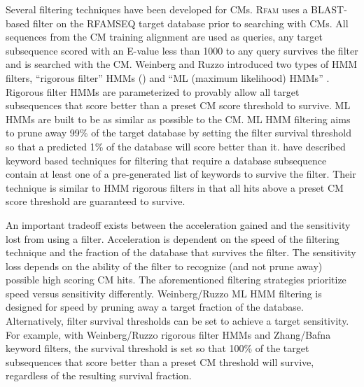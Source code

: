 Several filtering techniques have been developed for
CMs. \textsc{Rfam} uses a BLAST-based filter on the RFAMSEQ target
database prior to searching with CMs. All sequences from the CM
training alignment are used as queries, any target subsequence scored
with an E-value less than 1000 to any query survives the filter and is
searched with the CM. Weinberg and Ruzzo introduced two types of HMM
filters, ``rigorous filter'' HMMs (\citep{WeinbergRuzzo4}) and ``ML
(maximum likelihood) HMMs'' \citep{WeinbergRuzzo06}. Rigorous filter
HMMs are parameterized to provably allow all target subsequences that
score better than a preset CM score threshold to survive.  ML HMMs are
built to be as similar as possible to the CM. ML HMM filtering aims to
prune away 99\% of the target database by setting the filter survival
threshold so that a predicted 1\% of the database will score better
than it.  \citet{ZhangBafna06} have described keyword based techniques
for filtering that require a database subsequence contain at least one
of a pre-generated list of keywords to survive the filter. Their
technique is similar to HMM rigorous filters in that all hits above a
preset CM score threshold are guaranteed to survive.

An important tradeoff exists between the acceleration gained and the
sensitivity lost from using a filter. Acceleration is dependent on the
speed of the filtering technique and the fraction of the database that
survives the filter. The sensitivity loss depends on the ability of
the filter to recognize (and not prune away) possible high scoring CM
hits. The aforementioned filtering strategies prioritize speed versus
sensitivity differently.  Weinberg/Ruzzo ML HMM filtering
is designed for speed by pruning away a target fraction of
the database. Alternatively, filter survival thresholds can be set to
achieve a target sensitivity. For example, with Weinberg/Ruzzo
rigorous filter HMMs and Zhang/Bafna keyword filters, the survival
threshold is set so that 100\% of the target subsequences that score
better than a preset CM threshold will survive, regardless
of the resulting survival fraction.

